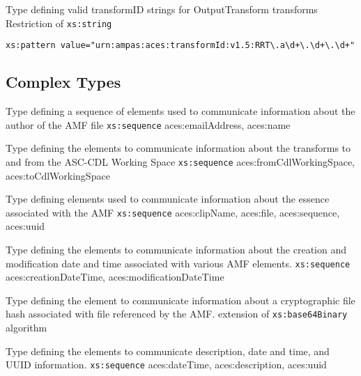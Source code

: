             {Type defining valid transformID strings for OutputTransform transforms}
            {Restriction of \texttt{xs:string}}
            
            \begin{adjustwidth}{5mm}{}            
            \lstinline{xs:pattern value="urn:ampas:aces:transformId:v1.5:RRT\.a\d+\.\d+\.\d+"}
            \end{adjustwidth}

\subsection{Complex Types}

            {Type defining a sequence of elements used to communicate information about the author of the AMF file}
            {\texttt{xs:sequence}}
            {aces:emailAddress, aces:name}
            
            {Type defining the elements to communicate information about the transforms to and from the ASC-CDL Working Space}
            {\texttt{xs:sequence}}
            {aces:fromCdlWorkingSpace, aces:toCdlWorkingSpace}
            
            {Type defining elements used to communicate information about the essence associated with the AMF}
            {\texttt{xs:sequence}}
            {aces:clipName, aces:file, aces:sequence, aces:uuid}
            
            {Type defining the elements to communicate information about the creation and modification date and time associated with various AMF elements.}
            {\texttt{xs:sequence}}
            {aces:creationDateTime, aces:modificationDateTime}

            {Type defining the element to communicate information about a cryptographic file hash associated with file referenced by the AMF.}
            {extension of \texttt{xs:base64Binary}}
            {algorithm}
            
            {Type defining the elements to communicate description, date and time, and UUID information.}
            {\texttt{xs:sequence}}
            {aces:dateTime, aces:description, aces:uuid}
            
